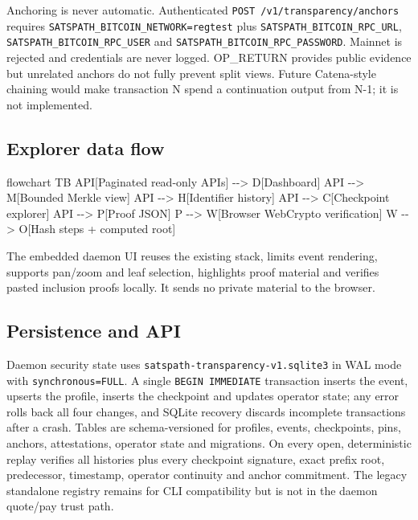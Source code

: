 \documentclass[
]{article}
\newenvironment{Shaded}{}{}
\newcommand{\NormalTok}[1]{#1}
\begin{document}
Anchoring is never automatic. Authenticated
\texttt{POST\ /v1/transparency/anchors} requires
\texttt{SATSPATH\_BITCOIN\_NETWORK=regtest} plus
\texttt{SATSPATH\_BITCOIN\_RPC\_URL},
\texttt{SATSPATH\_BITCOIN\_RPC\_USER} and
\texttt{SATSPATH\_BITCOIN\_RPC\_PASSWORD}. Mainnet is rejected and
credentials are never logged. OP\_RETURN provides public evidence but
unrelated anchors do not fully prevent split views. Future Catena-style
chaining would make transaction N spend a continuation output from N-1;
it is not implemented.

\hypertarget{explorer-data-flow}{%
\subsection{Explorer data flow}\label{explorer-data-flow}}

\begin{Shaded}
\begin{Highlighting}[]
\NormalTok{flowchart TB}
\NormalTok{  API[Paginated read{-}only APIs] {-}{-}\textgreater{} D[Dashboard]}
\NormalTok{  API {-}{-}\textgreater{} M[Bounded Merkle view]}
\NormalTok{  API {-}{-}\textgreater{} H[Identifier history]}
\NormalTok{  API {-}{-}\textgreater{} C[Checkpoint explorer]}
\NormalTok{  API {-}{-}\textgreater{} P[Proof JSON]}
\NormalTok{  P {-}{-}\textgreater{} W[Browser WebCrypto verification]}
\NormalTok{  W {-}{-}\textgreater{} O[Hash steps + computed root]}
\end{Highlighting}
\end{Shaded}

The embedded daemon UI reuses the existing stack, limits event
rendering, supports pan/zoom and leaf selection, highlights proof
material and verifies pasted inclusion proofs locally. It sends no
private material to the browser.

\hypertarget{persistence-and-api}{%
\subsection{Persistence and API}\label{persistence-and-api}}

Daemon security state uses \texttt{satspath-transparency-v1.sqlite3} in
WAL mode with \texttt{synchronous=FULL}. A single
\texttt{BEGIN\ IMMEDIATE} transaction inserts the event, upserts the
profile, inserts the checkpoint and updates operator state; any error
rolls back all four changes, and SQLite recovery discards incomplete
transactions after a crash. Tables are schema-versioned for profiles,
events, checkpoints, pins, anchors, attestations, operator state and
migrations. On every open, deterministic replay verifies all histories
plus every checkpoint signature, exact prefix root, predecessor,
timestamp, operator continuity and anchor commitment. The legacy
standalone registry remains for CLI compatibility but is not in the
daemon quote/pay trust path.
\end{document}
